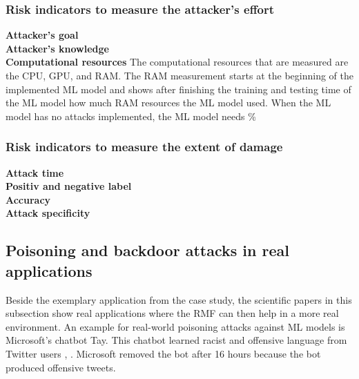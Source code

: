 \subsubsection*{Risk indicators to measure the attacker's effort}
\textbf{Attacker's goal} \\
\textbf{Attacker's knowledge} \\
\textbf{Computational resources} The computational resources that are measured are the CPU, GPU, and RAM. The RAM measurement starts at the beginning of the implemented ML model and shows after finishing the training and testing time of the ML model how much RAM resources the ML model used. When the ML model has no attacks implemented, the ML model needs \%

\subsubsection*{Risk indicators to measure the extent of damage}
\textbf{Attack time} \\
\textbf{Positiv and negative label} \\
\textbf{Accuracy} \\
\textbf{Attack specificity}


\subsection{Poisoning and backdoor attacks in real applications}

Beside the exemplary application from the case study, the scientific papers in this subsection show real applications where the RMF can then help in a more real environment. An example for real-world poisoning attacks against ML models is Microsoft's chatbot Tay. This chatbot learned racist and offensive language from Twitter users \cite{DBLP:conf/iciot/BaracaldoCLSZ18}, \cite{DBLP:conf/ccs/BaracaldoCLS17}. Microsoft removed the bot after 16 hours because the bot produced offensive tweets.

\newpage

